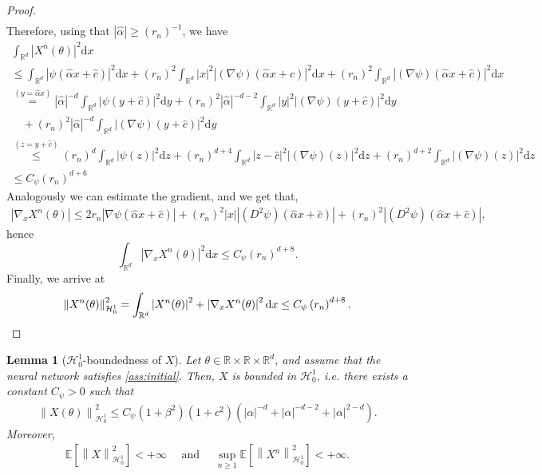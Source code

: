 \documentclass[11pt,a4paper,reqno]{amsart}
\numberwithin{equation}{section}
\theoremstyle{plain}
\newtheorem{lemma}[theorem]{Lemma}
\theoremstyle{definition}
\def\ud{\mathrm d}
\newcommand{\E}{\mathbb{E}}
\newcommand{\cH}{\mathcal{H}}
\newcommand{\R}{\mathbb{R}}
\newcommand{\norm}[1]{\left\|#1 \right\|} %
\newcommand{\abs}[1]{\left|#1\right|} %
\begin{document}
\begin{proof}
\begin{align*}
\end{align*}
Therefore, using that $\abs{\hat\alpha} \ge (r_n)^{-1}$, we have
\begin{multline*}
\int_{\R^d} \abs{X^n(\theta)}^2\ud x \\
    \le \int_{\R^d} \abs{\psi \left( \hat\alpha x + \hat c \right)}^2 \ud x + (r_n)^2 \int_{\R^d} \abs{x}^2 \abs{ (\nabla \psi)  \left( \hat\alpha x + \hat c \right)}^2 \ud x + (r_n)^2 \int_{\R^d} \abs{\left( \nabla \psi \right) \left( \hat\alpha x + \hat c \right)}^2 \ud x \\
    \stackrel{\left(y=\hat\alpha x\right)}{=} \abs{\hat\alpha}^{-d}\int_{\R^d} \abs{\psi \left(  y + \hat c \right)}^2 \ud y + (r_n)^2 \abs{\hat\alpha}^{-d-2}\int_{\R^d}\abs{y}^2 \abs{\left( \nabla \psi \right) \left(  y + \hat c \right)}^2\ud y \\
   \quad +(r_n)^2 \abs{\hat\alpha}^{-d}\int_{\R^d} \abs{\left( \nabla \psi \right) \left(  y + \hat c \right)}^2\ud y\\
  \stackrel{\left(z= y+ \hat c\right)} {\le} (r_n)^d\int_{\R^d} \abs{\psi \left(  z \right)}^2 \ud z+(r_n)^{d+4}\int_{\R^d}\abs{z - \hat c}^2 \abs{\left( \nabla \psi \right) \left(  z \right)}^2\ud z+(r_n)^{d+2}\int_{\R^d} \abs{\left( \nabla \psi \right) \left( z \right)}^2\ud z\\
 \le C_\psi (r_n)^{d+6}
\end{multline*}
Analogously we can estimate the gradient, and we get that, 
\begin{align*}
\abs{\nabla_x X^n(\theta)}
    \le 2 r_n\abs{\nabla\psi \left( \hat\alpha x + \hat c \right)} + \left(r_n\right)^2 \abs{x}\abs{\left( D^2 \psi \right) \left( \hat\alpha x + \hat c \right)} + (r_n)^2 \abs{\left( D^2 \psi \right) \left( \hat\alpha x + \hat c \right)},
\end{align*}
hence 
\[
    \int_{\R^d} \abs{\nabla_x X^n(\theta)}^2\ud x\le C_\psi (r_n)^{d+8}.
\]
Finally, we arrive at
\[
    \norm{X^n(\theta)}^2_{\cH_0^1}= \int_{\R^d} \abs{X^n(\theta)}^2+\abs{\nabla_xX^n(\theta)}^2\ud x \le C_\psi \left(r_n\right)^{d + 8}. \qedhere
\]
\end{proof}

\begin{lemma}[$\cH_0^1$-boundedness of $X$]
\label{lem:bound_XH}
Let $\theta\in \R\times\R\times\R^d$, and assume that the neural network satisfies \cref{ass:initial}.
Then, $X$ is bounded in $\cH_0^1$, \emph{i.e.} there exists a constant $C_\psi>0$ such that
\begin{align*}
    \norm{X(\theta)}^2_{\cH_0^1} 
        \le C_\psi\left(1+\beta^2\right) \left(1+c^2\right)\left(\abs{\alpha}^{-d}+\abs{\alpha}^{-d-2}+\abs{\alpha}^{2-d}\right).
\end{align*}
Moreover,
\begin{align*}
    \E \left[ \norm{X}^2_{\cH_0^1} \right] < + \infty 
       \quad \text{ and } \quad
    \sup_{n \ge 1} \E \left[ \norm{X^n}^2_{\cH_0^1} \right] < + \infty.
\end{align*}
\end{lemma}
\end{document}
